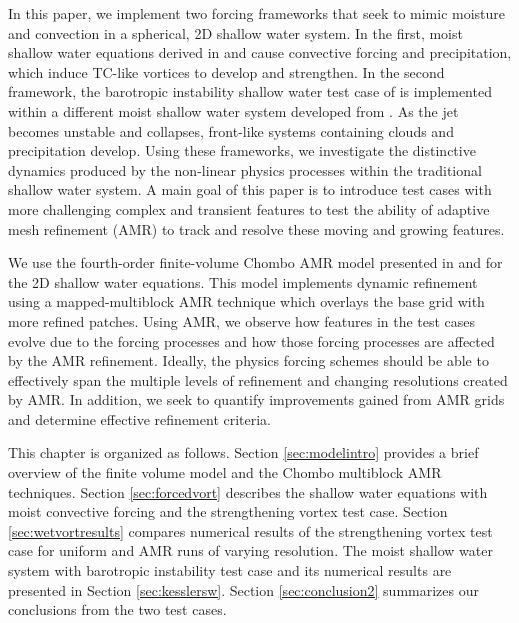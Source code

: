 In this paper, we implement two forcing frameworks that seek to mimic moisture 
and convection in a spherical, 2D shallow water system. In the first, 
 moist shallow water equations derived in \cite{bouchut2009fronts} and 
\cite{lahaye2016understanding} cause
 convective forcing and precipitation, which induce TC-like vortices to develop and strengthen. In the second 
framework, the barotropic instability shallow water test case of 
\cite{galewsky2004initial} is implemented within a different moist shallow water system developed from 
 \cite{zerroukat2015moist}. As the jet becomes unstable and collapses, front-like 
 systems containing clouds and precipitation develop. Using these frameworks, we
 investigate the distinctive dynamics produced by the non-linear physics processes
 within the traditional shallow water system. A main goal of this paper is to
 introduce test cases with more challenging complex and transient features
 to test the ability of adaptive mesh refinement (AMR) 
 to track and resolve these moving and growing features.
 
 We use the fourth-order finite-volume Chombo AMR model
 presented in \cite{mccorquodale2015adaptive} and
 \cite{ferguson2016analyzing} for the 2D shallow water equations. 
 This model implements dynamic refinement using
 a mapped-multiblock AMR technique which overlays the base grid with more refined patches.
 Using AMR, we observe how features in the test cases evolve due to the forcing 
 processes and how those forcing processes are affected by the AMR refinement. 
Ideally, the physics forcing schemes should be able to effectively span 
the multiple levels of refinement and changing resolutions created by AMR.
 In addition, we seek to quantify improvements gained from AMR grids
 and determine effective refinement criteria.

This chapter is organized as follows. Section \ref{sec:modelintro} provides a brief overview
of the finite volume model and the Chombo multiblock AMR techniques.
Section \ref{sec:forcedvort} describes the shallow water equations
with moist convective forcing and the strengthening vortex test case.
Section \ref{sec:wetvortresults} compares numerical results of the strengthening vortex
test case for uniform and AMR runs of varying resolution. The
 \cite{zerroukat2015moist} moist shallow water system with
 barotropic instability test case and its numerical results
 are presented in Section \ref{sec:kesslersw}.  Section \ref{sec:conclusion2} summarizes our
 conclusions from the two test cases.

